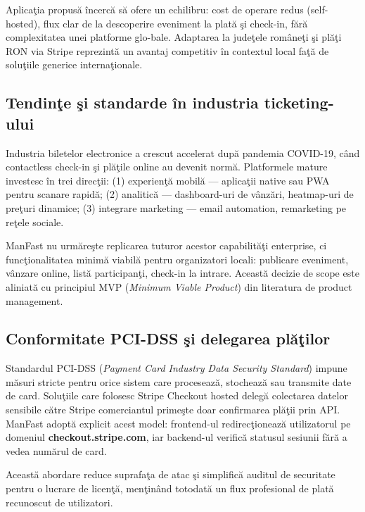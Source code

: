 Aplica\c tia propus\u a \^incerc\u a s\u a ofere un echilibru: cost de operare redus (self-hosted), flux clar de la descoperire eveniment la plat\u a \c si check-in, f\u ar\u a complexitatea unei platforme glo-bale. Adaptarea la jude\c tele rom\^ane\c ti \c si pl\u a\c ti RON via Stripe reprezint\u a un avantaj competitiv \^in contextul local fa\c t\u a de solu\c tiile generice interna\c tionale.

\subsection{Tendin\c te \c si standarde \^in industria ticketing-ului}

Industria biletelor electronice a crescut accelerat dup\u a pandemia COVID-19, c\^and contactless check-in \c si pl\u a\c tile online au devenit norm\u a. Platformele mature investesc \^in trei direc\c tii: (1) experien\c t\u a mobil\u a — aplica\c tii native sau PWA pentru scanare rapid\u a; (2) analitic\u a — dashboard-uri de v\^anz\u ari, heatmap-uri de pre\c turi dinamice; (3) integrare marketing — email automation, remarketing pe re\c tele sociale.

ManFast nu urm\u are\c ste replicarea tuturor acestor capabilit\u a\c ti enterprise, ci func\c tionalitatea minim\u a viabil\u a pentru organizatori locali: publicare eveniment, v\^anzare online, list\u a \linebreak participan\c ti, check-in la intrare. Aceast\u a decizie de scope este aliniat\u a cu principiul MVP (\textit{Minimum Viable Product}) din literatura de product management.

\subsection{Conformitate PCI-DSS \c si delegarea pl\u a\c tilor}

Standardul PCI-DSS (\textit{Payment Card Industry Data Security Standard}) impune m\u asuri stricte pentru orice sistem care proceseaz\u a, stocheaz\u a sau transmite date de card. Solu\c tiile care folosesc Stripe Checkout hosted deleg\u a colectarea datelor sensibile c\u atre Stripe comerciantul prime\c ste doar confirmarea pl\u a\c tii prin API. \newpage ManFast adopt\u a explicit acest model: frontend-ul redirec\c tioneaz\u a utilizatorul pe domeniul \textbf{checkout.stripe.com}, iar backend-ul verific\u a statusul sesiunii f\u ar\u a a vedea num\u arul de card.

Aceast\u a abordare reduce suprafa\c ta de atac \c si simplific\u a auditul de securitate pentru o lucrare de licen\c t\u a, men\c tin\^and totodat\u a un flux profesional de plat\u a recunoscut de utilizatori.

